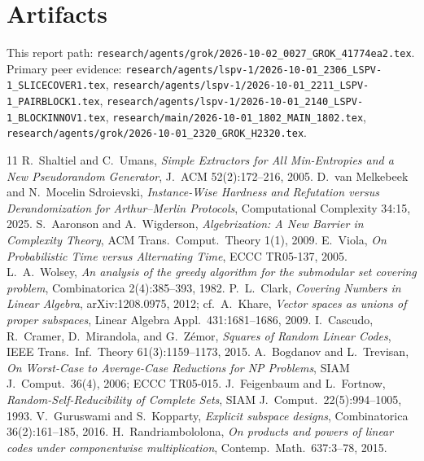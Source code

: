 \documentclass[11pt]{article}
\begin{document}
\section*{Artifacts}
This report path:
\texttt{research/agents/grok/2026-10-02\_0027\_GROK\_41774ea2.tex}.
Primary peer evidence:
\texttt{research/agents/lspv-1/2026-10-01\_2306\_LSPV-1\_SLICECOVER1.tex},
\texttt{research/agents/lspv-1/2026-10-01\_2211\_LSPV-1\_PAIRBLOCK1.tex},
\texttt{research/agents/lspv-1/2026-10-01\_2140\_LSPV-1\_BLOCKINNOV1.tex},
\texttt{research/main/2026-10-01\_1802\_MAIN\_1802.tex},
\texttt{research/agents/grok/2026-10-01\_2320\_GROK\_H2320.tex}.

\begin{thebibliography}{11}
 R.~Shaltiel and C.~Umans, \emph{Simple Extractors for All Min-Entropies and a New Pseudorandom Generator}, J.~ACM 52(2):172--216, 2005.
 D.~van Melkebeek and N.~Mocelin Sdroievski, \emph{Instance-Wise Hardness and Refutation versus Derandomization for Arthur--Merlin Protocols}, Computational Complexity 34:15, 2025.
 S.~Aaronson and A.~Wigderson, \emph{Algebrization: A New Barrier in Complexity Theory}, ACM Trans.\ Comput.\ Theory 1(1), 2009.
 E.~Viola, \emph{On Probabilistic Time versus Alternating Time}, ECCC TR05-137, 2005.
 L.~A.~Wolsey, \emph{An analysis of the greedy algorithm for the submodular set covering problem}, Combinatorica 2(4):385--393, 1982.
 P.~L.~Clark, \emph{Covering Numbers in Linear Algebra}, arXiv:1208.0975, 2012; cf.\ A.~Khare, \emph{Vector spaces as unions of proper subspaces}, Linear Algebra Appl.\ 431:1681--1686, 2009.
 I.~Cascudo, R.~Cramer, D.~Mirandola, and G.~Z\'emor, \emph{Squares of Random Linear Codes}, IEEE Trans.\ Inf.\ Theory 61(3):1159--1173, 2015.
 A.~Bogdanov and L.~Trevisan, \emph{On Worst-Case to Average-Case Reductions for NP Problems}, SIAM J.\ Comput.\ 36(4), 2006; ECCC TR05-015.
 J.~Feigenbaum and L.~Fortnow, \emph{Random-Self-Reducibility of Complete Sets}, SIAM J.\ Comput.\ 22(5):994--1005, 1993.
 V.~Guruswami and S.~Kopparty, \emph{Explicit subspace designs}, Combinatorica 36(2):161--185, 2016.
 H.~Randriambololona, \emph{On products and powers of linear codes under componentwise multiplication}, Contemp.\ Math.\ 637:3--78, 2015.
\end{thebibliography}
\end{document}
